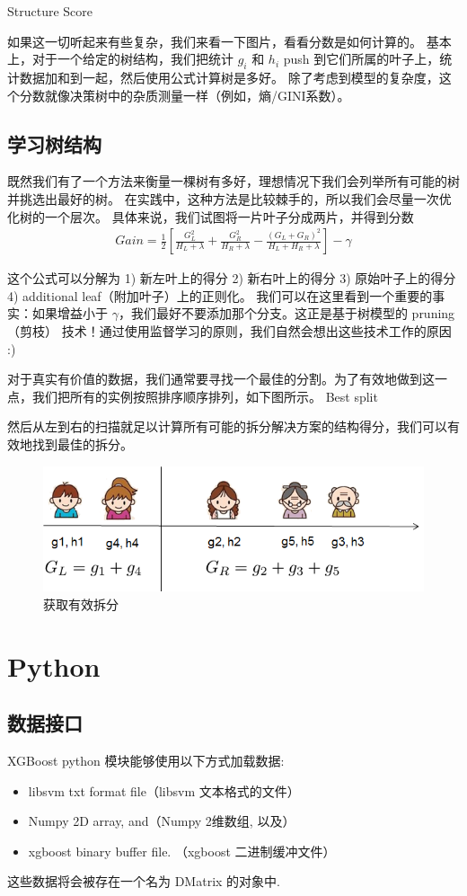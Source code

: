 \documentclass{article}
\begin{document}
Structure Score

如果这一切听起来有些复杂，我们来看一下图片，看看分数是如何计算的。 基本上，对于一个给定的树结构，我们把统计 $g_i$ 和 $h_i$ push 到它们所属的叶子上，统计数据加和到一起，然后使用公式计算树是多好。 除了考虑到模型的复杂度，这个分数就像决策树中的杂质测量一样（例如，熵/GINI系数）。

\subsection{学习树结构}
既然我们有了一个方法来衡量一棵树有多好，理想情况下我们会列举所有可能的树并挑选出最好的树。 在实践中，这种方法是比较棘手的，所以我们会尽量一次优化树的一个层次。 具体来说，我们试图将一片叶子分成两片，并得到分数
\begin{equation*}
	\begin{split}
		Gain=\frac{1}{2}[\frac{G_L^2}{H_L+\lambda}+\frac{G_R^2}{H_R+\lambda}-\frac{(G_L+G_R)^2}{H_L+H_R+\lambda}]-\gamma 
	\end{split}
\end{equation*}

这个公式可以分解为 1) 新左叶上的得分 2) 新右叶上的得分 3) 原始叶子上的得分 4) additional leaf（附加叶子）上的正则化。 我们可以在这里看到一个重要的事实：如果增益小于 $\gamma$，我们最好不要添加那个分支。这正是基于树模型的 pruning（剪枝） 技术！通过使用监督学习的原则，我们自然会想出这些技术工作的原因 :)

对于真实有价值的数据，我们通常要寻找一个最佳的分割。为了有效地做到这一点，我们把所有的实例按照排序顺序排列，如下图所示。 Best split

然后从左到右的扫描就足以计算所有可能的拆分解决方案的结构得分，我们可以有效地找到最佳的拆分。
\begin{figure}[H]
	\centering
	\includegraphics[scale=0.5]{split_find.png}
	\caption{获取有效拆分}
\end{figure}
\section{Python}
\subsection{数据接口}
XGBoost python 模块能够使用以下方式加载数据:
\begin{itemize}
\item libsvm txt format file（libsvm 文本格式的文件）
\item Numpy 2D array, and（Numpy 2维数组, 以及）
\item xgboost binary buffer file. （xgboost 二进制缓冲文件）
\end{itemize}
这些数据将会被存在一个名为 DMatrix 的对象中.
\end{document}
